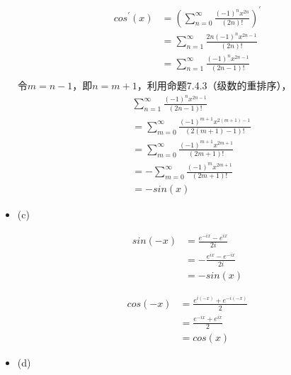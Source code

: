 \documentclass{article}
\begin{document}
\begin{itemize}
        \begin{align*}
          cos^\prime(x) & = \left(\sum\limits_{n = 0}^\infty \frac{(-1)^nx^{2n}}{(2n)!}\right)^\prime \\
                        & = \sum\limits_{n = 1}^\infty \frac{2n(-1)^nx^{2n-1}}{(2n)!}                 \\
                        & = \sum\limits_{n = 1}^\infty \frac{(-1)^nx^{2n-1}}{(2n-1)!}                 \\
        \end{align*}
        令$m = n - 1$，即$n = m + 1$，利用命题7.4.3（级数的重排序），
        \begin{align*}
           & \sum\limits_{n = 1}^\infty \frac{(-1)^nx^{2n-1}}{(2n-1)!}                     \\
           & = \sum\limits_{m = 0}^\infty \frac{(-1)^{m + 1}x^{2(m + 1)-1}}{(2(m + 1)-1)!} \\
           & = \sum\limits_{m = 0}^\infty \frac{(-1)^{m + 1}x^{2m + 1}}{(2m + 1)!}         \\
           & = - \sum\limits_{m = 0}^\infty \frac{(-1)^{m}x^{2m + 1}}{(2m + 1)!}           \\
           & = -sin(x)
        \end{align*}

  \item (c)

        \begin{align*}
          sin(-x) & = \frac{e^{-ix} - e^{ix}}{2i}   \\
                  & = - \frac{e^{ix} - e^{-ix}}{2i} \\
                  & = -sin(x)
        \end{align*}

        \begin{align*}
          cos(-x) & = \frac{e^{i(-x)} + e^{-i(-x)}}{2} \\
                  & = \frac{e^{-ix} + e^{ix}}{2}       \\
                  & = cos(x)
        \end{align*}

  \item (d)


\end{itemize}
\end{document}
